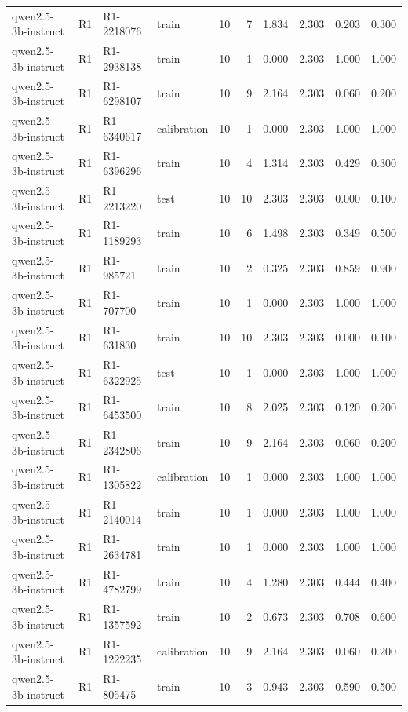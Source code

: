 \begin{table}
\begin{tabular}{llllrrrrrr}
qwen2.5-3b-instruct & R1 & R1-2218076 & train & 10 & 7 & 1.834 & 2.303 & 0.203 & 0.300 \\
qwen2.5-3b-instruct & R1 & R1-2938138 & train & 10 & 1 & 0.000 & 2.303 & 1.000 & 1.000 \\
qwen2.5-3b-instruct & R1 & R1-6298107 & train & 10 & 9 & 2.164 & 2.303 & 0.060 & 0.200 \\
qwen2.5-3b-instruct & R1 & R1-6340617 & calibration & 10 & 1 & 0.000 & 2.303 & 1.000 & 1.000 \\
qwen2.5-3b-instruct & R1 & R1-6396296 & train & 10 & 4 & 1.314 & 2.303 & 0.429 & 0.300 \\
qwen2.5-3b-instruct & R1 & R1-2213220 & test & 10 & 10 & 2.303 & 2.303 & 0.000 & 0.100 \\
qwen2.5-3b-instruct & R1 & R1-1189293 & train & 10 & 6 & 1.498 & 2.303 & 0.349 & 0.500 \\
qwen2.5-3b-instruct & R1 & R1-985721 & train & 10 & 2 & 0.325 & 2.303 & 0.859 & 0.900 \\
qwen2.5-3b-instruct & R1 & R1-707700 & train & 10 & 1 & 0.000 & 2.303 & 1.000 & 1.000 \\
qwen2.5-3b-instruct & R1 & R1-631830 & train & 10 & 10 & 2.303 & 2.303 & 0.000 & 0.100 \\
qwen2.5-3b-instruct & R1 & R1-6322925 & test & 10 & 1 & 0.000 & 2.303 & 1.000 & 1.000 \\
qwen2.5-3b-instruct & R1 & R1-6453500 & train & 10 & 8 & 2.025 & 2.303 & 0.120 & 0.200 \\
qwen2.5-3b-instruct & R1 & R1-2342806 & train & 10 & 9 & 2.164 & 2.303 & 0.060 & 0.200 \\
qwen2.5-3b-instruct & R1 & R1-1305822 & calibration & 10 & 1 & 0.000 & 2.303 & 1.000 & 1.000 \\
qwen2.5-3b-instruct & R1 & R1-2140014 & train & 10 & 1 & 0.000 & 2.303 & 1.000 & 1.000 \\
qwen2.5-3b-instruct & R1 & R1-2634781 & train & 10 & 1 & 0.000 & 2.303 & 1.000 & 1.000 \\
qwen2.5-3b-instruct & R1 & R1-4782799 & train & 10 & 4 & 1.280 & 2.303 & 0.444 & 0.400 \\
qwen2.5-3b-instruct & R1 & R1-1357592 & train & 10 & 2 & 0.673 & 2.303 & 0.708 & 0.600 \\
qwen2.5-3b-instruct & R1 & R1-1222235 & calibration & 10 & 9 & 2.164 & 2.303 & 0.060 & 0.200 \\
qwen2.5-3b-instruct & R1 & R1-805475 & train & 10 & 3 & 0.943 & 2.303 & 0.590 & 0.500 \\

\end{tabular}
\end{table}
